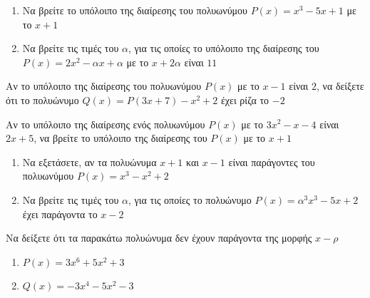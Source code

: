 \documentclass{presentation}
\begin{document}
\begin{askisi}
  \begin{enumerate}
    \item<1-> Να βρείτε το υπόλοιπο της διαίρεσης του πολυωνύμου $P(x)=x^3-5x+1$ με το $x+1$
    \item<2-> Να βρείτε τις τιμές του $α$, για τις οποίες το υπόλοιπο της διαίρεσης του $P(x)=2x^2-αx+α$ με το $x+2α$ είναι $11$
  \end{enumerate}


\end{askisi}

\begin{askisi}
  Αν το υπόλοιπο της διαίρεσης του πολυωνύμου $P(x)$ με το $x-1$ είναι $2$, να δείξετε ότι το πολυώνυμο $Q(x)=P(3x+7)-x^2+2$ έχει ρίζα το $-2$


\end{askisi}

\begin{askisi}
  Αν το υπόλοιπο της διαίρεσης ενός πολυωνύμου $P(x)$ με το $3x^2-x-4$ είναι $2x+5$, να βρείτε το υπόλοιπο της διαίρεσης του $P(x)$ με το $x+1$


\end{askisi}

\begin{askisi}
  \begin{enumerate}
    \item<1-> Να εξετάσετε, αν τα πολυώνυμα $x+1$ και $x-1$ είναι παράγοντες του πολυωνύμου $P(x)=x^3-x^2+2$
    \item<2-> Να βρείτε τις τιμές του $α$, για τις οποίες το πολυώνυμο $P(x)=α^3x^3-5x+2$ έχει παράγοντα το $x-2$
  \end{enumerate}


\end{askisi}

\begin{askisi}
  Να δείξετε ότι τα παρακάτω πολυώνυμα δεν έχουν παράγοντα της μορφής $x-ρ$
  \begin{enumerate}
    \item<1-> $P(x)=3x^6+5x^2+3$
    \item<2-> $Q(x)=-3x^4-5x^2-3$
  \end{enumerate}


\end{askisi}
\end{document}
